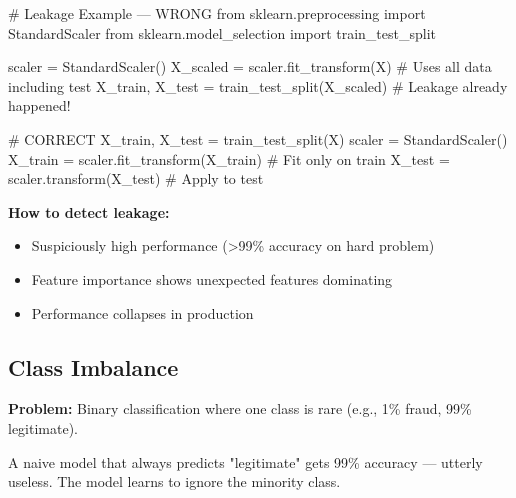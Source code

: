 \documentclass[11pt]{article}
\providecommand{\tightlist}{\setlength{\itemsep}{1pt}\setlength{\parskip}{0pt}}
\newenvironment{Shaded}{\begin{snugshade}}{\end{snugshade}}
\newcommand{\CommentTok}[1]{\textcolor[rgb]{0.48,0.49,0.49}{#1}}
\newcommand{\ImportTok}[1]{\textcolor[rgb]{0.15,0.68,0.38}{#1}}
\newcommand{\NormalTok}[1]{\textcolor[rgb]{0.81,0.81,0.76}{#1}}
\newcommand{\OperatorTok}[1]{\textcolor[rgb]{0.81,0.81,0.76}{#1}}
\begin{document}

\begin{Shaded}
\begin{Highlighting}[]
\CommentTok{\# Leakage Example — WRONG}
\ImportTok{from}\NormalTok{ sklearn.preprocessing }\ImportTok{import}\NormalTok{ StandardScaler}
\ImportTok{from}\NormalTok{ sklearn.model\_selection }\ImportTok{import}\NormalTok{ train\_test\_split}

\NormalTok{scaler }\OperatorTok{=}\NormalTok{ StandardScaler()}
\NormalTok{X\_scaled }\OperatorTok{=}\NormalTok{ scaler.fit\_transform(X)          }\CommentTok{\# Uses all data including test}
\NormalTok{X\_train, X\_test }\OperatorTok{=}\NormalTok{ train\_test\_split(X\_scaled)  }\CommentTok{\# Leakage already happened!}

\CommentTok{\# CORRECT}
\NormalTok{X\_train, X\_test }\OperatorTok{=}\NormalTok{ train\_test\_split(X)}
\NormalTok{scaler }\OperatorTok{=}\NormalTok{ StandardScaler()}
\NormalTok{X\_train }\OperatorTok{=}\NormalTok{ scaler.fit\_transform(X\_train)     }\CommentTok{\# Fit only on train}
\NormalTok{X\_test }\OperatorTok{=}\NormalTok{ scaler.transform(X\_test)           }\CommentTok{\# Apply to test}
\end{Highlighting}
\end{Shaded}

\textbf{How to detect leakage:}

\begin{itemize}
\tightlist
\item
  Suspiciously high performance (\textgreater99\% accuracy on hard problem)
\item
  Feature importance shows unexpected features dominating
\item
  Performance collapses in production
\end{itemize}

\subsection{Class Imbalance}\label{class-imbalance}

\textbf{Problem:} Binary classification where one class is rare (e.g., 1\% fraud, 99\% legitimate).

A naive model that always predicts "legitimate" gets 99\% accuracy --- utterly useless. The model learns to ignore the minority class.
\end{document}
